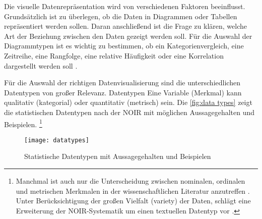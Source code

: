 
Die visuelle Datenrepräsentation wird von verschiedenen Faktoren beeinflusst.
Grundsätzlich ist zu überlegen, ob die Daten in Diagrammen oder Tabellen repräsentiert werden sollen.
Daran anschließend ist die Frage zu klären, welche Art der Beziehung zwischen den Daten gezeigt werden soll.
Für die Auswahl der Diagrammtypen ist es wichtig zu bestimmen, ob ein Kategorienvergleich, eine Zeitreihe, eine Rangfolge, 
eine relative Häufigkeit oder eine Korrelation dargestellt werden soll \cite[vgl.][137]{few_show_2012}.

Für die Auswahl der richtigen Datenvisualisierung sind die unterschiedlichen Datentypen von großer Relevanz.
Datentypen  \cite[99]{kirk_data_2019}  Eine Variable (Merkmal) kann qualitativ (kategorial) oder quantitativ (metrisch) sein.
Die \autoref{fig:data types} zeigt die statistischen Datentypen nach der \acrfull{NOIR} 
\cite[vgl.][12 ff.]{bortz_statistik_2010} mit möglichen Aussagegehalten und Beispielen.
\footnote{Manchmal ist auch nur die Unterscheidung zwischen nominalen, ordinalen und metrischen
Merkmalen in der wissenschaftlichen Literatur anzutreffen \cite[vgl.][20]{cleff_deskriptive_2011}. 
Unter Berücksichtigung der großen Vielfalt (variety) der Daten, schlägt  
eine Erweiterung der \acrshort{NOIR}-Systematik um einen textuellen Datentyp vor \cite[vgl.][100]{kirk_data_2019}.}

 
 \begin{figure}[h]
    \centering
        \texttt{[image: datatypes]}
        \caption{Statistische Datentypen mit Aussagegehalten und Beispielen}
        \label{fig:data types}
\end{figure}


